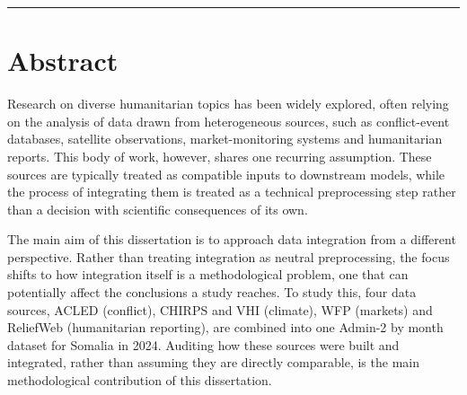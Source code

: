 \documentclass[12pt,a4paper]{article}
\begin{document}
\vspace{6pt}
\noindent\rule{\linewidth}{0.8pt}

\vspace{10pt}
\noindent{}
\endgroup
\clearpage

\section*{Abstract}

Research on diverse humanitarian topics has been widely explored, often relying on the analysis of data drawn from heterogeneous sources, such as conflict-event databases, satellite observations, market-monitoring systems and humanitarian reports. This body of work, however, shares one recurring assumption. These sources are typically treated as compatible inputs to downstream models, while the process of integrating them is treated as a technical preprocessing step rather than a decision with scientific consequences of its own.

The main aim of this dissertation is to approach data integration from a different perspective. Rather than treating integration as neutral preprocessing, the focus shifts to how integration itself is a methodological problem, one that can potentially affect the conclusions a study reaches. To study this, four data sources, ACLED (conflict), CHIRPS and VHI (climate), WFP (markets) and ReliefWeb (humanitarian reporting), are combined into one Admin-2 by month dataset for Somalia in 2024. Auditing how these sources were built and integrated, rather than assuming they are directly comparable, is the main methodological contribution of this dissertation.
\end{document}
